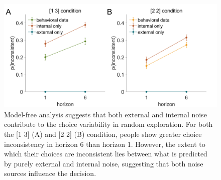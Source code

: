 \documentclass[12pt]{article}
\begin{document}
	
	
	
	
	\begin{figure}[h]
		\begin{center}
			\includegraphics[width=\textwidth]{figures/theory_da_info.png}
			\caption{Model-free analysis suggests that both external and internal noise contribute to the choice variability in random exploration. For both the [1 3] (A) and [2 2] (B) condition, people show greater choice inconsistency in horizon 6 than horizon 1. However, the extent to which their choices are inconsistent lies between what is predicted by purely external and internal noise, suggesting that both noise sources influence the decision.}
			\label{fig:mf2}
		\end{center}
	\end{figure}
	
\end{document}
